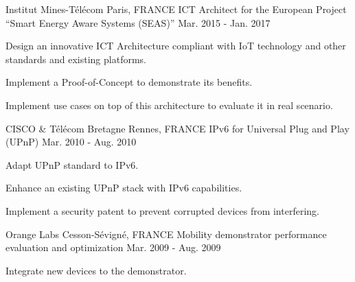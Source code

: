\begin{cventries}
  \cventry
    {Institut Mines-T\'{e}l\'{e}com}
    {Paris, FRANCE}
    {ICT Architect for the European Project ``Smart Energy Aware Systems (SEAS)''}
    {Mar. 2015 - Jan. 2017}
    {
      \begin{cvitems}
        \item {Design an innovative ICT Architecture compliant with IoT technology and other standards and existing platforms.}
        \item {Implement a Proof-of-Concept to demonstrate its benefits.}
        \item {Implement use cases on top of this architecture to evaluate it in real scenario.}
      \end{cvitems}
    }
  \cventry
    {CISCO \& T\'{e}l\'{e}com Bretagne}
    {Rennes, FRANCE}
    {IPv6 for Universal Plug and Play (UPnP)}
    {Mar. 2010 - Aug. 2010}
    {
      \begin{cvitems}
        \item {Adapt UPnP standard to IPv6.}
        \item {Enhance an existing UPnP stack with IPv6 capabilities.}
        \item {Implement a security patent to prevent corrupted devices from interfering.}
      \end{cvitems}
    }
  \cventry
    {Orange Labs}
    {Cesson-S\'{e}vign\'{e}, FRANCE}
    {Mobility demonstrator performance evaluation and optimization}
    {Mar. 2009 - Aug. 2009}
    {
      \begin{cvitems}
        \item {Integrate new devices to the demonstrator.}

\end{cvitems}}
\end{cventries}
